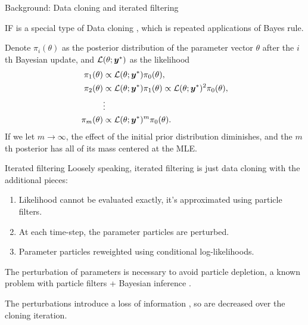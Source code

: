 \documentclass[aspectratio=169]{beamer}\usepackage[]{graphicx}\usepackage[]{xcolor}
\begin{document}
\begin{frame}{Background: Data cloning and iterated filtering}
  
  IF is a special type of Data cloning \citep{lele07}, which is repeated applications of Bayes rule. 
  
  Denote $\pi_i(\theta)$ as the posterior distribution of the parameter vector $\theta$ after the $i$th Bayesian update, and $\mathcal{L}(\theta; \bm{y}^*)$ as the likelihood
\begin{align*}
\pi_1(\theta) &\propto \mathcal{L}(\theta; \bm{y}^*)\pi_0(\theta), \\
\pi_2(\theta) &\propto \mathcal{L}(\theta; \bm{y}^*)\pi_1(\theta) \propto \mathcal{L}(\theta; \bm{y}^*)^2\pi_0(\theta),\\
&\vdots\\
\pi_m(\theta) &\propto \mathcal{L}(\theta; \bm{y}^*)^m\pi_0(\theta).
\end{align*}
If we let $m\rightarrow \infty$, the effect of the initial prior distribution diminishes, and the $m$th posterior has all of its mass centered at the MLE.

\end{frame}

\begin{frame}{Iterated filtering}
  Loosely speaking, iterated filtering is just data cloning with the additional pieces: 
  \begin{enumerate}
    \item Likelihood cannot be evaluated exactly, it's approximated using particle filters. 
    \item At each time-step, the parameter particles are perturbed.
    \item Parameter particles reweighted using conditional log-likelihoods.
  \end{enumerate}
  The perturbation of parameters is necessary to avoid particle depletion, a known problem with particle filters + Bayesian inference \citep{chen24}.
  
  The perturbations introduce a loss of information \citep{liu01}, so are decreased over the cloning iteration.
\end{frame}
\end{document}
